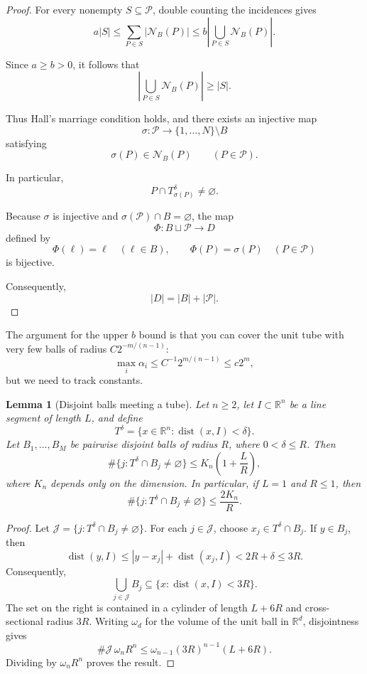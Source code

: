 \documentclass[11pt, letterpaper]{nyjm}
\newtheorem{lemma}[theorem]{Lemma}
\begin{document}
	\begin{proof}
		For every nonempty $S\subseteq\mathcal P$,
		double counting the incidences gives
		\[
		a|S|
		\le \sum_{P\in S}|\mathcal N_B(P)|
		\le b\left|
		\bigcup_{P\in S}\mathcal N_B(P)
		\right|.
		\]
		
		Since $a\ge b>0$, it follows that
		\[
		\left|
		\bigcup_{P\in S}\mathcal N_B(P)
		\right|
		\ge |S|.
		\]
		
		Thus Hall's marriage condition holds, and
		there exists an injective map
		\[
		\sigma:\mathcal P
		\longrightarrow\{1,\ldots,N\}\setminus B
		\]
		satisfying
		\[
		\sigma(P)\in\mathcal N_B(P)
		\qquad(P\in\mathcal P).
		\]
		
		In particular,
		\[
		P\cap T_{\sigma(P)}^\delta\ne\varnothing.
		\]
		
		Because $\sigma$ is injective and
		$\sigma(\mathcal P)\cap B=\varnothing$,
		the map
		\[
		\Phi:B\sqcup\mathcal P\longrightarrow D
		\]
		defined by
		\[
		\Phi(\ell)=\ell\quad(\ell\in B),
		\qquad
		\Phi(P)=\sigma(P)\quad(P\in\mathcal P)
		\]
		is bijective.
		
		Consequently,
		\[
		|D|=|B|+|\mathcal P|.
		\]
	\end{proof}
	
	
	The argument for the upper $b$ bound is that you can cover the unit tube with very few balls of radius $C2^{-m/(n-1)}$: 
	\[
	\max_i \alpha_i \leq C^{-1}2^{m/(n-1)} \leq c2^{m},
	\]
	but we need to track constants.
	\begin{lemma}[Disjoint balls meeting a tube] \label{lem:disjoint-ball-tube}
		Let $n\ge2$, let $I\subset\mathbb{R}^n$ be a line segment
		of length $L$, and define
		\[
		T^\delta=\{x\in\mathbb{R}^n:\operatorname{dist}(x,I)<\delta\}.
		\]
		Let $B_1,\ldots,B_M$ be pairwise disjoint balls of radius $R$,
		where $0<\delta\le R$. Then
		\[
		\#\{j:T^\delta\cap B_j\ne\varnothing\}
		\le K_n\left(1+\frac{L}{R}\right),
		\]
		where $K_n$ depends only on the dimension.
		In particular, if $L=1$ and $R\le1$, then
		\[
		\#\{j:T^\delta\cap B_j\ne\varnothing\}\le \frac{2K_n}{R}.
		\]
	\end{lemma}
	
	\begin{proof}
		Let $\mathcal{J}=\{j:T^\delta\cap B_j\ne\varnothing\}$.
		For each $j\in\mathcal{J}$, choose $x_j\in T^\delta\cap B_j$.
		If $y\in B_j$, then
		\[
		\operatorname{dist}(y,I)
		\le |y-x_j|+\operatorname{dist}(x_j,I)
		<2R+\delta\le3R.
		\]
		Consequently,
		\[
		\bigcup_{j\in\mathcal{J}}B_j
		\subseteq\{x:\operatorname{dist}(x,I)<3R\}.
		\]
		The set on the right is contained in a cylinder of length
		$L+6R$ and cross-sectional radius $3R$.
		Writing $\omega_d$ for the volume of the unit ball in
		$\mathbb{R}^d$, disjointness gives
		\[
		\#\mathcal{J}\,\omega_n R^n
		\le \omega_{n-1}(3R)^{n-1}(L+6R).
		\]
		Dividing by $\omega_n R^n$ proves the result.
	\end{proof}
	
\end{document}
